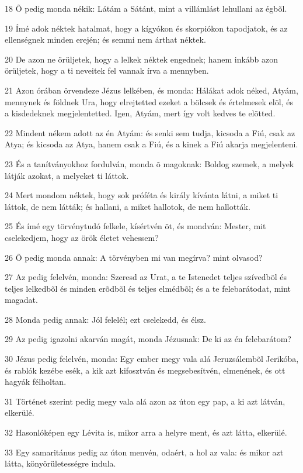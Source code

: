 \par 18 Õ pedig monda nékik: Látám a Sátánt, mint a villámlást lehullani az égbõl.
\par 19 Ímé adok néktek hatalmat, hogy a kígyókon és skorpiókon tapodjatok, és az ellenségnek minden erején; és semmi nem árthat néktek.
\par 20 De azon ne örüljetek, hogy a lelkek néktek engednek; hanem inkább azon örüljetek, hogy a ti neveitek fel vannak írva a mennyben.
\par 21 Azon órában örvendeze Jézus lelkében, és monda: Hálákat adok néked, Atyám, mennynek és földnek Ura, hogy elrejtetted ezeket a bölcsek és értelmesek elõl, és a kisdedeknek megjelentetted. Igen, Atyám, mert így volt kedves te elõtted.
\par 22 Mindent nékem adott az én Atyám: és senki sem tudja, kicsoda a Fiú, csak az Atya; és kicsoda az Atya, hanem  csak a Fiú, és a kinek a Fiú akarja megjelenteni.
\par 23 És a tanítványokhoz fordulván, monda õ magoknak: Boldog szemek, a melyek látják azokat,  a melyeket ti láttok.
\par 24 Mert mondom néktek, hogy sok próféta és király kívánta látni, a miket ti láttok, de nem látták; és hallani, a miket hallotok, de nem hallották.
\par 25 És ímé egy törvénytudó felkele, kísértvén õt, és mondván: Mester, mit cselekedjem, hogy az örök életet vehessem?
\par 26 Õ pedig monda annak: A törvényben mi van megírva? mint olvasod?
\par 27 Az pedig felelvén, monda: Szeresd az Urat, a te Istenedet teljes szívedbõl és teljes lelkedbõl és minden erõdbõl és teljes elmédbõl; és a te felebarátodat, mint magadat.
\par 28 Monda pedig annak: Jól felelél; ezt cselekedd, és élsz.
\par 29 Az pedig igazolni akarván magát, monda Jézusnak: De ki az én felebarátom?
\par 30 Jézus pedig felelvén, monda: Egy ember megy vala alá Jeruzsálembõl Jerikóba, és rablók kezébe esék, a kik azt kifosztván és megsebesítvén, elmenének, és ott hagyák félholtan.
\par 31 Történet szerint pedig megy vala alá azon az úton egy pap, a ki azt látván, elkerülé.
\par 32 Hasonlóképen egy Lévita is, mikor arra a helyre ment, és azt látta, elkerülé.
\par 33 Egy samaritánus pedig az úton menvén, odaért, a hol az vala: és mikor azt látta, könyörületességre indula.
